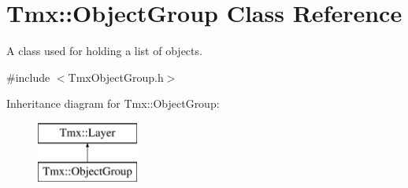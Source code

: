 \hypertarget{classTmx_1_1ObjectGroup}{\section{Tmx\-:\-:Object\-Group Class Reference}
\label{classTmx_1_1ObjectGroup}
}


A class used for holding a list of objects.  




{\ttfamily \#include $<$Tmx\-Object\-Group.\-h$>$}

Inheritance diagram for Tmx\-:\-:Object\-Group\-:\begin{figure}[H]
\begin{center}
\leavevmode
\includegraphics[height=2.000000cm]{classTmx_1_1ObjectGroup}
\end{center}
\end{figure}
